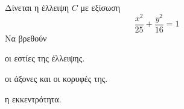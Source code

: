 Δίνεται η έλλειψη $ C $ με εξίσωση
\[ \frac{x^2}{25}+\frac{y^2}{16}=1 \]
Να βρεθούν
\begin{alist}
\item οι εστίες της έλλειψης.
\item οι άξονες και οι κορυφές της.
\item η εκκεντρότητα.
\end{alist}
